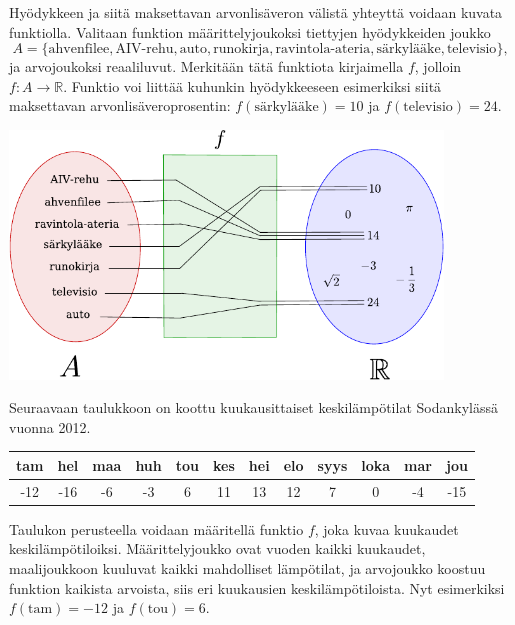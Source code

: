 \begin{esimerkki}
	Hyödykkeen ja siitä maksettavan arvonlisäveron välistä yhteyttä voidaan kuvata funktiolla.
	Valitaan funktion määrittelyjoukoksi tiettyjen hyödykkeiden joukko
		\[ A = \{\text{ahvenfilee}, \text{AIV-rehu}, \text{auto}, \text{runokirja},
		\text{ravintola-ateria}, \text{särkylääke}, \text{televisio}\}, \]
	ja arvojoukoksi reaaliluvut. Merkitään tätä funktiota kirjaimella $f$, jolloin
	$f\colon A \to \mathbb{R}$.
	Funktio voi liittää kuhunkin hyödykkeeseen esimerkiksi siitä maksettavan arvonlisäveroprosentin:
	$f(\text{särkylääke}) = 10$ ja $f(\text{televisio}) = 24$.

	\begin{center}
		\includegraphics[width=11.5cm]{pictures/funktiokone.pdf}
	\end{center}
\end{esimerkki}



\begin{esimerkki}
Seuraavaan taulukkoon on koottu kuukausittaiset keskilämpötilat Sodankylässä vuonna 2012.

	\begin{tabular}{|c|c|c|c|c|c|c|c|c|c|c|c|}
	\hline
	tam & hel & maa & huh & tou & kes & hei & elo & syys & loka & mar & jou\\
	\hline
	-12 & -16 & -6 & -3 & 6 & 11 & 13 & 12 & 7 & 0 & -4 & -15\\
	\hline %
	\end{tabular}

Taulukon perusteella voidaan määritellä funktio $f$, joka kuvaa kuukaudet keskilämpötiloiksi. Määrittelyjoukko ovat vuoden kaikki kuukaudet, maalijoukkoon kuuluvat kaikki mahdolliset lämpötilat, ja arvojoukko koostuu funktion kaikista arvoista, siis eri kuukausien keskilämpötiloista. %
Nyt esimerkiksi $f(\text{tam}) = -12$ ja $f(\text{tou}) = 6$.

\end{esimerkki}

